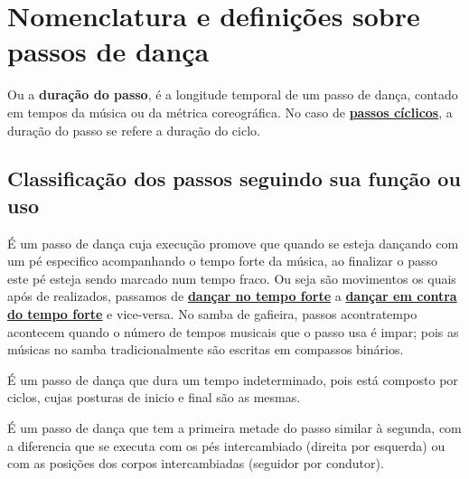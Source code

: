 
\section{Nomenclatura e definições sobre passos de dança}



\begin{definition} 
\label{def:DuracaoDoPasso}
Ou a \textbf{duração do passo}, 
é a longitude temporal de um passo de dança, contado em tempos da música ou da métrica coreográfica.
No caso de \hyperref[def:PassoCiclico]{\textbf{passos cíclicos}}, a duração do passo se refere a duração do ciclo.
\end{definition}

\subsection{Classificação dos passos seguindo sua função ou uso}

\begin{definition} 
\label{def:PassoAContratempo}
É um passo de dança cuja execução promove que quando se esteja dançando com um pé especifico acompanhando o tempo forte da música,
ao finalizar o passo este pé esteja sendo marcado num tempo fraco.
Ou seja são movimentos os quais após de realizados, 
passamos de \hyperref[def:DancaNoTempo]{\textbf{dançar no tempo forte}} a 
\hyperref[def:DancaNoContratempo]{\textbf{dançar em contra do tempo forte}} e vice-versa. 
No samba de gafieira, 
passos acontratempo acontecem quando o número de tempos musicais que o passo usa é impar;
pois as músicas no samba tradicionalmente são escritas em compassos binários. 
\end{definition}


\begin{definition} 
\label{def:PassoCiclico}
É um passo de dança que dura um tempo indeterminado,
pois está composto por ciclos, cujas posturas de inicio e final são as mesmas.
\end{definition}

\begin{definition} 
\label{def:PassoSimetrico}
É um passo de dança que tem a primeira metade do passo similar à segunda,
com a diferencia que se executa com os pés intercambiado (direita por esquerda)
ou com as posições dos corpos intercambiadas (seguidor por condutor).
\end{definition}

